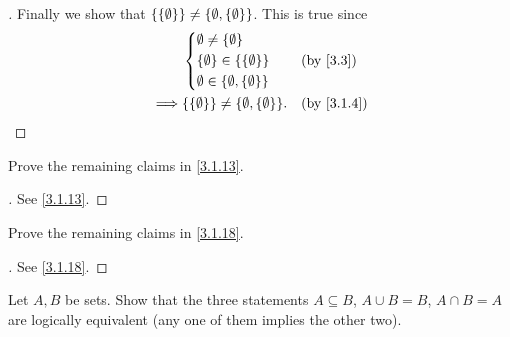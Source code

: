 \begin{proof}[]
  Finally we show that \(\left\lbrace\left\lbrace\emptyset\right\rbrace\right\rbrace \neq \left\lbrace\emptyset, \left\lbrace\emptyset\right\rbrace\right\rbrace\).
  This is true since
  \begin{align*}
             & \begin{dcases}
                 \emptyset \neq \set{\emptyset}                 \\
                 \set{\emptyset} \in \set{\set{\emptyset}}      \\
                 \emptyset \in \set{\emptyset, \set{\emptyset}} \\
               \end{dcases}    &  & \by{3.3}                       \\
    \implies & \set{\set{\emptyset}} \neq \set{\emptyset, \set{\emptyset}}. &  & \by{3.1.4}
  \end{align*}
\end{proof}

\begin{ex}\label{ex:3.1.3}
  Prove the remaining claims in \cref{3.1.13}.
\end{ex}

\begin{proof}[]
  See \cref{3.1.13}.
\end{proof}

\begin{ex}\label{ex:3.1.4}
  Prove the remaining claims in \cref{3.1.18}.
\end{ex}

\begin{proof}[]
  See \cref{3.1.18}.
\end{proof}

\begin{ex}\label{ex:3.1.5}
  Let \(A, B\) be sets.
  Show that the three statements \(A \subseteq B\), \(A \cup B = B\), \(A \cap B = A\) are logically equivalent (any one of them implies the other two).
\end{ex}

